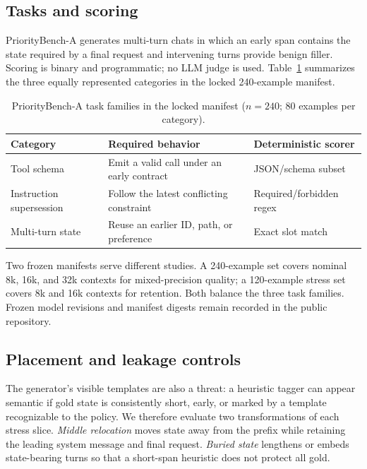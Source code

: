 \subsection{Tasks and scoring}
\label{sec:tasks}

PriorityBench-A generates multi-turn chats in which an early span contains the
state required by a final request and intervening turns provide benign filler.
Scoring is binary and programmatic; no LLM judge is used.  Table~\ref{tab:tasks}
summarizes the three equally represented categories in the locked 240-example
manifest.

\begin{table}[!tbp]
  \centering
  \caption{PriorityBench-A task families in the locked manifest ($n=240$;
  80 examples per category).}
  \label{tab:tasks}
  \begin{tabular}{lll}
    \toprule
    Category & Required behavior & Deterministic scorer \\
    \midrule
    Tool schema & Emit a valid call under an early contract & JSON/schema subset \\
    Instruction supersession & Follow the latest conflicting constraint & Required/forbidden regex \\
    Multi-turn state & Reuse an earlier ID, path, or preference & Exact slot match \\
    \bottomrule
  \end{tabular}
\end{table}

Two frozen manifests serve different studies.  A 240-example set covers nominal
8k, 16k, and 32k contexts for mixed-precision quality; a 120-example stress set
covers 8k and 16k contexts for retention.  Both balance the three task families.
Frozen model revisions and manifest digests remain recorded in the public
repository.

\subsection{Placement and leakage controls}
\label{sec:controls}

The generator's visible templates are also a threat: a heuristic tagger can
appear semantic if gold state is consistently short, early, or marked by a
template recognizable to the policy.  We therefore evaluate two transformations
of each stress slice.  \emph{Middle relocation} moves state away from the prefix
while retaining the leading system message and final request.  \emph{Buried
state} lengthens or embeds state-bearing turns so that a short-span heuristic
does not protect all gold.

